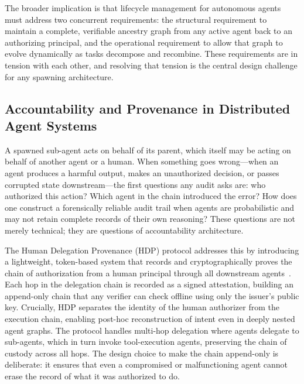 The broader implication is that lifecycle management for autonomous agents must address two concurrent requirements: the structural requirement to maintain a complete, verifiable ancestry graph from any active agent back to an authorizing principal, and the operational requirement to allow that graph to evolve dynamically as tasks decompose and recombine. These requirements are in tension with each other, and resolving that tension is the central design challenge for any spawning architecture.

\subsection{Accountability and Provenance in Distributed Agent Systems}
\label{sec:provenance}

A spawned sub-agent acts on behalf of its parent, which itself may be acting on behalf of another agent or a human. When something goes wrong---when an agent produces a harmful output, makes an unauthorized decision, or passes corrupted state downstream---the first questions any audit asks are: who authorized this action? Which agent in the chain introduced the error? How does one construct a forensically reliable audit trail when agents are probabilistic and may not retain complete records of their own reasoning? These questions are not merely technical; they are questions of accountability architecture.

The Human Delegation Provenance (HDP) protocol addresses this by introducing a lightweight, token-based system that records and cryptographically proves the chain of authorization from a human principal through all downstream agents~\cite{hdp2026}. Each hop in the delegation chain is recorded as a signed attestation, building an append-only chain that any verifier can check offline using only the issuer's public key. Crucially, HDP separates the identity of the human authorizer from the execution chain, enabling post-hoc reconstruction of intent even in deeply nested agent graphs. The protocol handles multi-hop delegation where agents delegate to sub-agents, which in turn invoke tool-execution agents, preserving the chain of custody across all hops. The design choice to make the chain append-only is deliberate: it ensures that even a compromised or malfunctioning agent cannot erase the record of what it was authorized to do.

